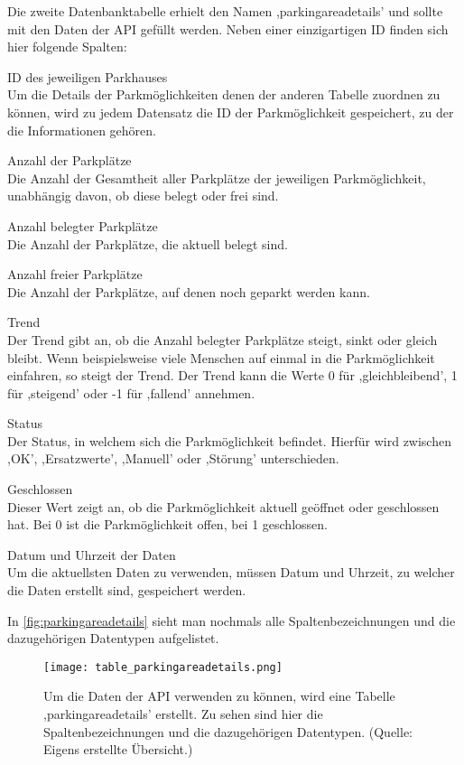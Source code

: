 Die zweite Datenbanktabelle erhielt den Namen ,parkingareadetails' und sollte mit den Daten der API gefüllt werden. Neben einer einzigartigen ID finden sich hier folgende Spalten: 
\begin{description}
	\item ID des jeweiligen Parkhauses \\ Um die Details der Parkmöglichkeiten denen der anderen Tabelle zuordnen zu können, wird zu jedem Datensatz die ID der Parkmöglichkeit gespeichert, zu der die Informationen gehören.
	\item Anzahl der Parkplätze \\ Die Anzahl der Gesamtheit aller Parkplätze der jeweiligen Parkmöglichkeit, unabhängig davon, ob diese belegt oder frei sind.
	\item Anzahl belegter Parkplätze \\ Die Anzahl der Parkplätze, die aktuell belegt sind.
	\item Anzahl freier Parkplätze \\ Die Anzahl der Parkplätze, auf denen noch geparkt werden kann.
	\item Trend \\ Der Trend gibt an, ob die Anzahl belegter Parkplätze steigt, sinkt oder gleich bleibt. Wenn beispielsweise viele Menschen auf einmal in die Parkmöglichkeit einfahren, so steigt der Trend. Der Trend kann die Werte 0 für ,gleichbleibend', 1 für ,steigend' oder -1 für ,fallend' annehmen.
	\item Status \\ Der Status, in welchem sich die Parkmöglichkeit befindet. Hierfür wird zwischen ,OK', ,Ersatzwerte', ,Manuell' oder ,Störung' unterschieden.
	\item Geschlossen \\ Dieser Wert zeigt an, ob die Parkmöglichkeit aktuell geöffnet oder geschlossen hat. Bei 0 ist die Parkmöglichkeit offen, bei 1 geschlossen.
	\item Datum und Uhrzeit der Daten \\ Um die aktuellsten Daten zu verwenden, müssen Datum und Uhrzeit, zu welcher die Daten erstellt sind, gespeichert werden.
\end{description}
In \autoref{fig:parkingareadetails} sieht man nochmals alle Spaltenbezeichnungen und die dazugehörigen Datentypen aufgelistet.

\begin{figure}[h]
	\centering
	\texttt{[image: table\_parkingareadetails.png]}
	\caption[Um die Daten der API verwenden zu können, wird eine Tabelle ,parkingareadetails' erstellt. Zu sehen sind hier die Spaltenbezeichnungen und die dazugehörigen Datentypen.]
	{Um die Daten der API verwenden zu können, wird eine Tabelle ,parkingareadetails' erstellt. Zu sehen sind hier die Spaltenbezeichnungen und die dazugehörigen Datentypen. (Quelle: Eigens erstellte Übersicht.)}
	\label{fig:parkingareadetails}
\end{figure}